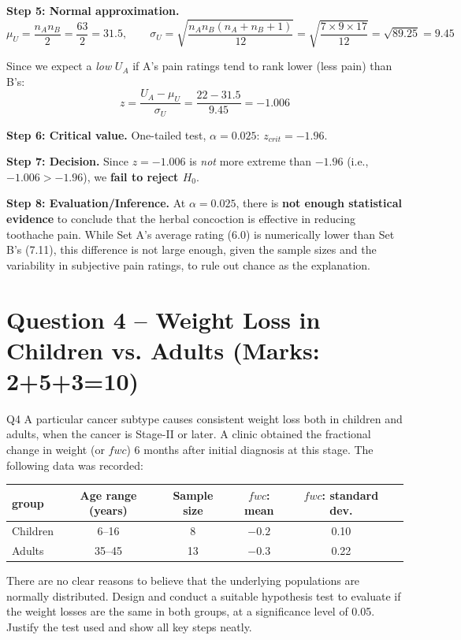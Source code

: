\documentclass[11pt]{article}
\begin{document}
\textbf{Step 5: Normal approximation.}
\[
\mu_U = \frac{n_A n_B}{2} = \frac{63}{2} = 31.5, \qquad
\sigma_U = \sqrt{\frac{n_A n_B(n_A+n_B+1)}{12}} = \sqrt{\frac{7\times9\times17}{12}} = \sqrt{89.25}=9.45
\]

Since we expect a \emph{low} $U_A$ if A's pain ratings tend to rank lower (less pain) than B's:
\[
z = \frac{U_A-\mu_U}{\sigma_U} = \frac{22-31.5}{9.45} = -1.006
\]

\textbf{Step 6: Critical value.} One-tailed test, $\alpha=0.025$: $z_{crit} = -1.96$.

\textbf{Step 7: Decision.} Since $z=-1.006$ is \emph{not} more extreme than $-1.96$ (i.e., $-1.006 > -1.96$), we \textbf{fail to reject $H_0$}.

\textbf{Step 8: Evaluation/Inference.} At $\alpha=0.025$, there is \textbf{not enough statistical evidence} to conclude that the herbal concoction is effective in reducing toothache pain. While Set A's average rating (6.0) is numerically lower than Set B's (7.11), this difference is not large enough, given the sample sizes and the variability in subjective pain ratings, to rule out chance as the explanation.

\section{Question 4 -- Weight Loss in Children vs. Adults (Marks: 2+5+3=10)}
\begin{question}{Q4}
A particular cancer subtype causes consistent weight loss both in children and adults, when the cancer is Stage-II or later. A clinic obtained the fractional change in weight (or $fwc$) 6 months after initial diagnosis at this stage. The following data was recorded:

\begin{center}
\begin{tabular}{lccccc}
\toprule
group & Age range (years) & Sample size & $fwc$: mean & $fwc$: standard dev. \\
\midrule
Children & 6--16 & 8 & $-0.2$ & 0.10 \\
Adults & 35--45 & 13 & $-0.3$ & 0.22 \\
\bottomrule
\end{tabular}
\end{center}

There are no clear reasons to believe that the underlying populations are normally distributed. Design and conduct a suitable hypothesis test to evaluate if the weight losses are the same in both groups, at a significance level of 0.05. Justify the test used and show all key steps neatly.
\end{question}
\end{document}
